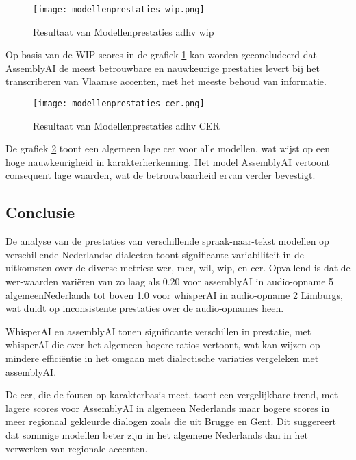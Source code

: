 \begin{figure}[h]
    \centering
    \texttt{[image: modellenprestaties\_wip.png]}
    \captionsetup{justification=centering}
    \caption{Resultaat van Modellenprestaties adhv \gls{wip}}
    \label{fig:modellenprestaties_wip}
\end{figure}
\FloatBarrier
Op basis van de WIP-scores in de grafiek \ref{fig:modellenprestaties_wip} kan worden geconcludeerd dat AssemblyAI de meest betrouwbare en nauwkeurige prestaties levert bij het transcriberen van Vlaamse accenten, met het meeste behoud van informatie.

\begin{figure}[h]
    \centering
    \texttt{[image: modellenprestaties\_cer.png]}
    \captionsetup{justification=centering}
    \caption{Resultaat van Modellenprestaties adhv CER}
    \label{fig:modellenprestaties_cer}
\end{figure}
\FloatBarrier

De grafiek \ref{fig:modellenprestaties_cer} toont een algemeen lage \gls{cer} voor alle modellen, wat wijst op een hoge nauwkeurigheid in karakterherkenning. Het model AssemblyAI vertoont consequent lage waarden, wat de betrouwbaarheid ervan verder bevestigt.
\subsection{Conclusie}

De analyse van de prestaties van verschillende spraak-naar-tekst modellen op verschillende Nederlandse dialecten toont significante variabiliteit in de uitkomsten over de diverse metrics: \gls{wer}, \gls{mer}, \gls{wil}, \gls{wip}, en \gls{cer}.
Opvallend is dat de \gls{wer}-waarden variëren van zo laag als 0.20 voor assemblyAI in audio-opname 5 algemeenNederlands tot boven 1.0 voor whisperAI in audio-opname 2 Limburgs, wat duidt op inconsistente prestaties over de audio-opnames heen. 

WhisperAI en assemblyAI tonen significante verschillen in prestatie, met whisperAI die over het algemeen hogere ratios vertoont, wat kan wijzen op mindere efficiëntie in het omgaan met dialectische variaties vergeleken met assemblyAI.

De \gls{cer}, die de fouten op karakterbasis meet, toont een vergelijkbare trend, met lagere scores voor AssemblyAI in algemeen Nederlands maar hogere scores in meer regionaal gekleurde dialogen zoals die uit Brugge en Gent. Dit suggereert dat sommige modellen beter zijn in het algemene Nederlands dan in het verwerken van regionale accenten.

